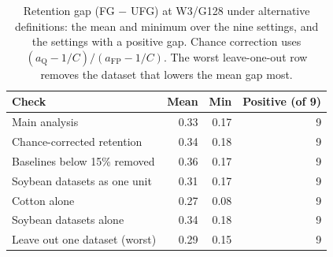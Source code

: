 \begin{table}[t]
\centering
\caption{Retention gap (FG $-$ UFG) at W3/G128 under alternative definitions: the mean and minimum over the nine settings, and the settings with a positive gap. Chance correction uses $(a_{\mathrm{Q}}-1/C)/(a_{\mathrm{FP}}-1/C)$. The worst leave-one-out row removes the dataset that lowers the mean gap most.}
\label{tab:robust}
\setlength{\tabcolsep}{3pt}
\small
\begin{tabular}{lrrr}
\toprule
Check & Mean & Min & Positive (of 9) \\
\midrule
Main analysis & 0.33 & 0.17 & 9 \\
Chance-corrected retention & 0.34 & 0.18 & 9 \\
Baselines below 15\% removed & 0.36 & 0.17 & 9 \\
Soybean datasets as one unit & 0.31 & 0.17 & 9 \\
Cotton alone & 0.27 & 0.08 & 9 \\
Soybean datasets alone & 0.34 & 0.18 & 9 \\
Leave out one dataset (worst) & 0.29 & 0.15 & 9 \\
\bottomrule
\end{tabular}
\end{table}
